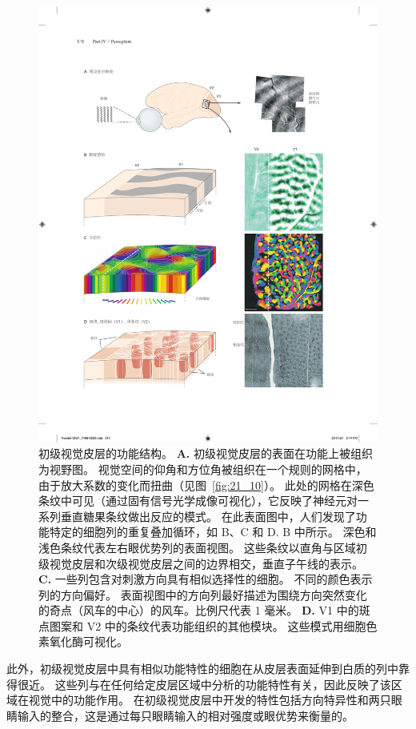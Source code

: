 \begin{figure}[htbp]
	\centering
	\includegraphics[width=0.95\linewidth]{chap21/fig_21_11}
	\caption{初级视觉皮层的功能结构。
		\textbf{A.} 初级视觉皮层的表面在功能上被组织为视野图。 
		视觉空间的仰角和方位角被组织在一个规则的网格中，由于放大系数的变化而扭曲（见图~\ref{fig:21_10}）。
		此处的网格在深色条纹中可见（通过固有信号光学成像可视化），它反映了神经元对一系列垂直糖果条纹做出反应的模式。
		在此表面图中，人们发现了功能特定的细胞列的重复叠加循环，如 B、C 和 D. B 中所示。
		深色和浅色条纹代表左右眼优势列的表面视图。
		这些条纹以直角与区域初级视觉皮层和次级视觉皮层之间的边界相交，垂直子午线的表示。
		\textbf{C.} 一些列包含对刺激方向具有相似选择性的细胞。 
		不同的颜色表示列的方向偏好。
		表面视图中的方向列最好描述为围绕方向突然变化的奇点（风车的中心）的风车。比例尺代表 1 毫米。
		\textbf{D.} V1 中的斑点图案和 V2 中的条纹代表功能组织的其他模块。
		这些模式用细胞色素氧化酶可视化。}
	\label{fig:21_11}
\end{figure}


此外，初级视觉皮层中具有相似功能特性的细胞在从皮层表面延伸到白质的列中靠得很近。
这些列与在任何给定皮层区域中分析的功能特性有关，因此反映了该区域在视觉中的功能作用。
在初级视觉皮层中开发的特性包括方向特异性和两只眼睛输入的整合，这是通过每只眼睛输入的相对强度或眼优势来衡量的。


